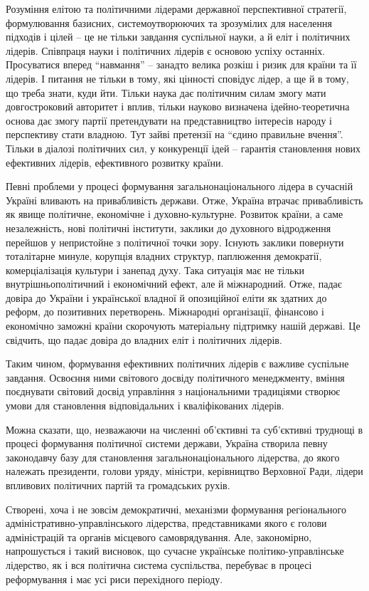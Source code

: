 Розуміння елітою та політичними лідерами державної перспективної стратегії, формулювання базисних, системоутворюючих та зрозумілих для населення підходів і цілей – це не тільки завдання суспільної науки, а й еліт і політичних лідерів. Співпраця науки і політичних лідерів є основою успіху останніх. Просуватися вперед “навмання” – занадто велика розкіш і ризик для країни та її лідерів. І питання не тільки в тому, які цінності сповідує лідер, а ще й в тому, що треба знати, куди йти. Тільки наука дає політичним силам змогу мати довгостроковий авторитет і вплив, тільки науково визначена ідейно-теоретична основа дає змогу партії претендувати на представництво інтересів народу і перспективу стати владною. Тут зайві претензії на “єдино правильне вчення”. Тільки в діалозі політичних сил, у конкуренції ідей – гарантія становлення нових ефективних лідерів, ефективного розвитку країни.

Певні проблеми у процесі формування загальнонаціонального лідера в сучасній Україні вливають на привабливість держави. Отже, Україна втрачає привабливість як явище політичне, економічне і духовно-культурне. Розвиток країни, а саме незалежність, нові політичні інститути, заклики до духовного відродження перейшов у непристойне з політичної точки зору. Існують заклики повернути тоталітарне минуле, корупція владних структур, паплюження демократії, комерціалізація культури і занепад духу. Така ситуація має не тільки внутрішньополітичний і економічний ефект, але й міжнародний. Отже, падає довіра до України і української владної й опозиційної еліти як здатних до реформ, до позитивних перетворень. Міжнародні організації, фінансово і економічно заможні країни скорочують матеріальну підтримку нашій державі. Це свідчить, що падає довіра до владних еліт і політичних лідерів.

Таким чином, формування ефективних політичних лідерів є важливе суспільне завдання. Освоєння ними світового досвіду політичного менеджменту, вміння поєднувати світовий досвід управління з національними традиціями створює умови для становлення відповідальних і кваліфікованих лідерів.

Можна сказати, що, незважаючи на численні об’єктивні та суб’єктивні труднощі в процесі формування політичної системи держави, Україна створила певну законодавчу базу для становлення загальнонаціонального лідерства, до якого належать президенти, голови уряду, міністри, керівництво Верховної Ради, лідери впливових політичних партій та громадських рухів.

Створені, хоча і не зовсім демократичні, механізми формування регіонального адміністративно-управлінського лідерства, представниками якого є голови адміністрацій та органів місцевого самоврядування. Але, закономірно, напрошується і такий висновок, що сучасне українське політико-управлінське лідерство, як і вся політична система суспільства, перебуває в процесі реформування і має усі риси перехідного періоду.